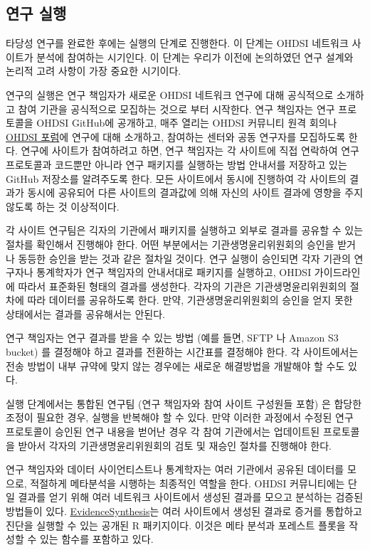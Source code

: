 \documentclass[11pt]{book}
\theoremstyle{definition}
\theoremstyle{definition}
\theoremstyle{definition}
\theoremstyle{remark}
\begin{document}
\subsection{연구 실행}\label{--1}

타당성 연구를 완료한 후에는 실행의 단계로 진행한다. 이 단계는 OHDSI
네트워크 사이트가 분석에 참여하는 시기인다. 이 단계는 우리가 이전에
논의하였던 연구 설계와 논리적 고려 사항이 가장 중요한 시기이다.

연구의 실행은 연구 책임자가 새로운 OHDSI 네트워크 연구에 대해 공식적으로
소개하고 참여 기관을 공식적으로 모집하는 것으로 부터 시작한다. 연구
책임자는 연구 프로토콜을 OHDSI GitHub에 공개하고, 매주 열리는 OHDSI
커뮤니티 원격 회의나 \href{http://forums.ohdsi.org}{OHDSI 포럼}에 연구에
대해 소개하고, 참여하는 센터와 공동 연구자를 모집하도록 한다. 연구에
사이트가 참여하려고 하면, 연구 책임자는 각 사이트에 직접 연락하여 연구
프로토콜과 코드뿐만 아니라 연구 패키지를 실행하는 방법 안내서를 저장하고
있는 GitHub 저장소를 알려주도록 한다. 모든 사이트에서 동시에 진행하여 각
사이트의 결과가 동시에 공유되어 다른 사이트의 결과값에 의해 자신의
사이트 결과에 영향을 주지 않도록 하는 것 이상적이다.

각 사이트 연구팀은 긱자의 기관에서 패키지를 실행하고 외부로 결과를
공유할 수 있는 절차를 확인해서 진행해야 한다. 어떤 부분에서는
기관생명윤리위원회의 승인을 받거나 동등한 승인을 받는 것과 같은 절차일
것이다. 연구 실행이 승인되면 각자 기관의 연구자나 통계학자가 연구
책임자의 안내서대로 패키지를 실행하고, OHDSI 가이드라인에 따라서
표준화된 형태의 결과를 생성한다. 각자의 기관은 기관생명윤리위원회의
절차에 따라 데이터를 공유하도록 한다. 만약, 기관생명윤리위원회의 승인을
얻지 못한 상태에서는 결과를 공유해서는 안된다.

연구 책임자는 연구 결과를 받을 수 있는 방법 (예를 들면, SFTP 나 Amazon
S3 bucket) 를 결정해야 하고 결과를 전환하는 시간표를 결정해야 한다. 각
사이트에서는 전송 방법이 내부 규약에 맞지 않는 경우에는 새로운
해결방법을 개발해야 할 수도 있다.

실행 단계에서는 통합된 연구팀 (연구 책임자와 참여 사이트 구성원들 포함)
은 합당한 조정이 필요한 경우, 실행을 반복해야 할 수 있다. 만약 이러한
과정에서 수정된 연구 프로토콜이 승인된 연구 내용을 벋어난 경우 각 참여
기관에서는 업데이트된 프로토콜을 받아서 각자의 기관생명윤리위원회의 검토
및 재승인 절차를 진행해야 한다.

연구 책임자와 데이터 사이언티스트나 통계학자는 여러 기관에서 공유된
데이터를 모으로, 적절하게 메타분석을 시행하는 최종적인 역할을 한다.
OHDSI 커뮤니티에는 단일 결과를 얻기 위해 여러 네트워크 사이트에서 생성된
결과를 모으고 분석하는 검증된 방법들이 있다.
\href{https://github.com/OHDSI/EvidenceSynthesis}{EvidenceSynthesis}는
여러 사이트에서 생성된 결과로 증거를 통합하고 진단을 실행할 수 있는
공개된 R 패키지이다. 이것은 메타 분석과 포레스트 플롯을 작성할 수 있는
함수를 포함하고 있다.
\end{document}
